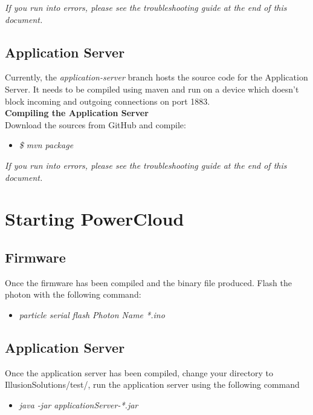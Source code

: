 \documentclass[a4paper,10pt]{article}
\begin{document}
			\textit{If you run into errors, please see the troubleshooting guide at the end of this document.}
			
		\subsection{Application Server}
			Currently, the \textit{application-server} branch hosts the source code for the Application Server. It needs to be compiled using maven and run on a device which doesn't block incoming and outgoing connections on port 1883.\\
			
			\textbf{Compiling the Application Server}\\
			Download the sources from GitHub and compile:\\
			
			\begin{itemize}
				\item \textit{\$ mvn package}
			\end{itemize}		
				
			\textit{If you run into errors, please see the troubleshooting guide at the end of this document.}
			
			\newpage
	\section{Starting PowerCloud}
		\subsection{Firmware}
			Once the firmware has been compiled and the binary file produced. Flash the photon with the following command:
			
			\begin{itemize}
				\item \textit{particle serial flash Photon Name *.ino}
			\end{itemize}
			
		\subsection{Application Server}
			Once the application server has been compiled, change your directory to IllusionSolutions/test/, run the application server using the following command
			
			\begin{itemize}
				\item \textit{java -jar applicationServer-*.jar}
			\end{itemize}
			
\end{document}
